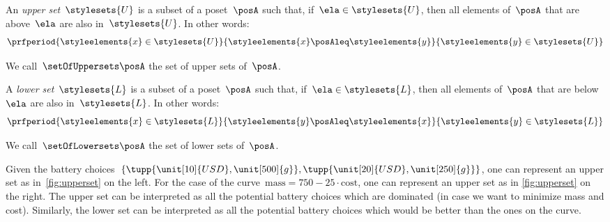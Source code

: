 
\begin{definition}
    \label{def:upperset}
    An \emph{upper set}~$\stylesets{U}$ is a subset of a poset~$\posA$ such that, if~$\ela \in \stylesets{U}$, then all elements of~$\posA$ that are above~$\ela$ are also in~$\stylesets{U}$.
    In other words:
    \begin{equation}
        \prfperiod{\styleelements{x}\in \stylesets{U}}{\styleelements{x}\posAleq \styleelements{y}}{\styleelements{y}\in \stylesets{U}}
    \end{equation}
\end{definition}
We call~$\setOfUppersets \posA$ the set of upper sets of~$\posA$.

\begin{definition}
    \label{def:lowerset}
    A \emph{lower set}~$\stylesets{L}$ is a subset of a poset~$\posA$ such that, if~$\ela \in \stylesets{L}$, then all elements of~$\posA$ that are below~$\ela$ are also in~$\stylesets{L}$.
    In other words:
    \begin{equation}
        \prfperiod{\styleelements{x}\in \stylesets{L}}{\styleelements{y}\posAleq \styleelements{x}}{\styleelements{y}\in \stylesets{L}}
    \end{equation}
\end{definition}
We call~$\setOfLowersets \posA$ the set of lower sets of~$\posA$.
%

Given the battery choices~$\{\tupp{\unit[10]{USD},\unit[500]{g}},\tupp{\unit[20]{USD},\unit[250]{g}}\}$, one can represent an upper set as in~\cref{fig:upperset} on the left.
For the case of the curve~$\text{mass}=750-25\cdot \text{cost}$, one can represent an upper set as in \cref{fig:upperset} on the right.
The upper set can be interpreted as all the potential battery choices which are dominated (in case we want to minimize mass and cost).
Similarly, the lower set can be interpreted as all the potential battery choices which would be better than the ones on the curve.


